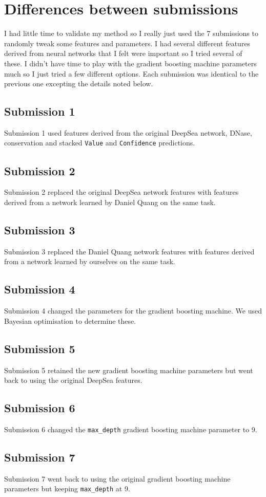 \documentclass{article}
\begin{document}
\section*{Differences between submissions}

I had little time to validate my method so I really just used the 7 submissions
to randomly tweak some features and parameters.  I had several different
features derived from neural networks that I felt were important so I tried
several of these. I didn't have time to play with the gradient boosting machine
parameters much so I just tried a few different options.  Each submission was
identical to the previous one excepting the details noted below.

\subsection*{Submission 1}

Submission 1 used features derived from the original DeepSea network, DNase,
conservation and stacked \texttt{Value} and \texttt{Confidence} predictions.


\subsection*{Submission 2}

Submission 2 replaced the original DeepSea network features with features
derived from a network learned by Daniel Quang on the same task.


\subsection*{Submission 3}

Submission 3 replaced the Daniel Quang network features with features derived
from a network learned by ourselves on the same task.


\subsection*{Submission 4}

Submission 4 changed the parameters for the gradient boosting machine.  We used
Bayesian optimisation to determine these.


\subsection*{Submission 5}

Submission 5 retained the new gradient boosting machine parameters but went
back to using the original DeepSea features.


\subsection*{Submission 6}

Submission 6 changed the \texttt{max\_depth} gradient boosting machine parameter
to 9.


\subsection*{Submission 7}

Submission 7 went back to using the original gradient boosting machine parameters
but keeping \texttt{max\_depth} at 9.
\end{document}
